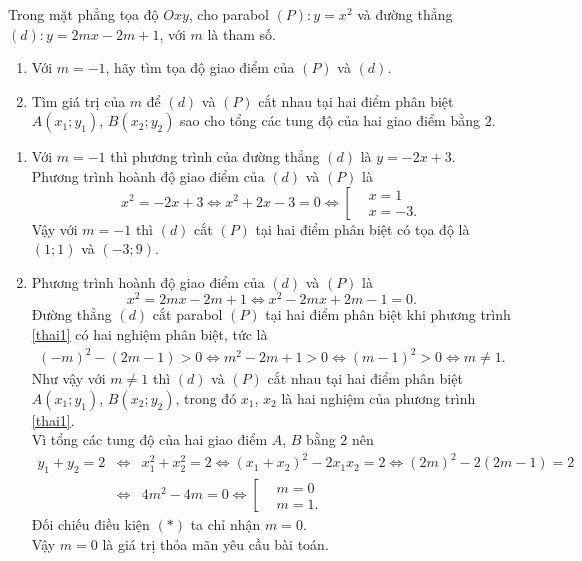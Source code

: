 \begin{ex}%
 Trong mặt phẳng tọa độ $Oxy$, cho parabol $(P) \colon y=x^2$ và đường thẳng $(d) \colon y=2mx-2m+1$, với $m$ là tham số.
 \begin{enumerate}
  \item Với $m=-1$, hãy tìm tọa độ giao điểm của $(P)$ và $(d)$.
  \item Tìm giá trị của $m$ để $(d)$ và $(P)$ cắt nhau tại hai điểm phân biệt $A(x_1;y_1)$, $B(x_2;y_2)$ sao cho tổng các tung độ của hai giao điểm bằng $2$.
 \end{enumerate}
 \loigiai
  {
  \begin{enumerate}
   \item Với $m=-1$ thì phương trình của đường thẳng $(d)$ là $y=-2x+3$.\\
   Phương trình hoành độ giao điểm của $(d)$ và $(P)$ là
   \begin{equation*}
    x^2=-2x+3 \Leftrightarrow x^2+2x-3=0 \Leftrightarrow \left[\begin{aligned} & x=1 \\& x=-3. \end{aligned}\right.
   \end{equation*}
   Vậy với $m=-1$ thì $(d)$ cắt $(P)$ tại hai điểm phân biệt có tọa độ là $(1;1)$ và $(-3;9)$.
   \item Phương trình hoành độ giao điểm của $(d)$ và $(P)$ là
   \begin{equation}
    x^2=2mx-2m+1 \Leftrightarrow x^2-2mx+2m-1=0. \label{thai1}
   \end{equation}
   Đường thẳng $(d)$ cắt parabol $(P)$ tại hai điểm phân biệt khi phương trình \eqref{thai1} có hai nghiệm phân biệt, tức là
   \begin{align*}
    (-m)^2-(2m-1)>0 \Leftrightarrow m^2-2m+1>0 \Leftrightarrow (m-1)^2>0 \Leftrightarrow m \neq 1.\tag{$*$}
   \end{align*}
   Như vậy với $m \neq 1$ thì $(d)$ và $(P)$ cắt nhau tại hai điểm phân biệt $A(x_1;y_1)$, $B(x_2;y_2)$, trong đó $x_1$, $x_2$ là hai nghiệm của phương trình \eqref{thai1}.\\
   Vì tổng các tung độ của hai giao điểm $A$, $B$ bằng $2$ nên
   \begin{eqnarray*}
    y_1+y_2=2 &\Leftrightarrow & x_1^2+x_2^2=2 \Leftrightarrow \left(x_1+x_2\right)^2-2x_1x_2=2 \Leftrightarrow (2m)^2-2(2m-1)=2\\
    		  &\Leftrightarrow & 4m^2-4m=0 \Leftrightarrow \left[\begin{aligned} & m=0 \\& m=1.\end{aligned}\right.
   \end{eqnarray*}
   Đối chiếu điều kiện $(*)$ ta chỉ nhận $m=0$.\\
   Vậy $m=0$ là giá trị thỏa mãn yêu cầu bài toán.
  \end{enumerate}
  }
\end{ex}

